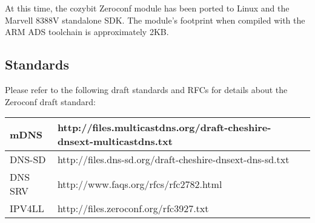 \documentclass[11pt,titlepage]{article}
\begin{document}
At this time, the cozybit Zeroconf module has been ported to Linux and the 
Marvell 8388V standalone SDK.  The module's footprint when compiled with the
ARM ADS toolchain is approximately 2KB.

\subsection{Standards}

Please refer to the following draft standards and RFCs for details about the
Zeroconf draft standard:

\vspace{1ex}
\begin{tabular}{|l|l|}
\hline
mDNS & http://files.multicastdns.org/draft-cheshire-dnsext-multicastdns.txt \\
\hline
DNS-SD & http://files.dns-sd.org/draft-cheshire-dnsext-dns-sd.txt \\
\hline
DNS SRV & http://www.faqs.org/rfcs/rfc2782.html \\
\hline
IPV4LL & http://files.zeroconf.org/rfc3927.txt \\
\hline
\end{tabular}
\end{document}
